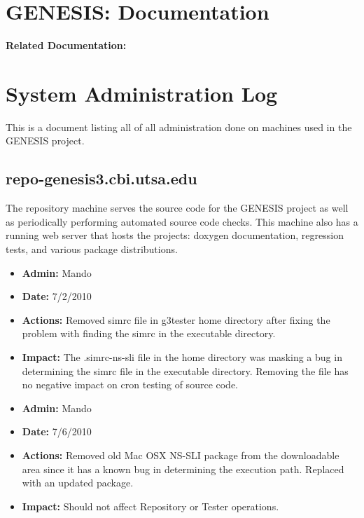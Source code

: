 \documentclass[12pt]{article}
\begin{document}
\section*{GENESIS: Documentation}

{\bf Related Documentation:}

\section*{System Administration Log}

This is a document listing all of all administration done on machines used in the GENESIS project.

\subsection*{repo-genesis3.cbi.utsa.edu}

The repository machine serves the source code for the GENESIS project as well as periodically performing automated source code checks. This machine also has a running web server that hosts the projects: doxygen documentation, regression tests, and various package distributions.

\begin{itemize}
\item[] {\bf Admin:} Mando
\item[] {\bf Date:} 7/2/2010 
\item[] {\bf Actions:} Removed simrc file in g3tester home directory after fixing the problem with finding the simrc in the executable directory.
\item[] {\bf Impact:} The .simrc-ns-sli file in the home directory was masking a bug in determining the simrc file in the executable directory. Removing the file has no negative impact on cron testing of source code. 
\end{itemize}


\begin{itemize}
\item[] {\bf Admin:} Mando
\item[] {\bf Date:} 7/6/2010
\item[] {\bf Actions:} Removed old Mac OSX NS-SLI package from the downloadable area since it has a known bug in determining the execution path. Replaced with an updated package.  
\item[] {\bf Impact:} Should not affect Repository or Tester operations.
\end{itemize}
\end{document}
